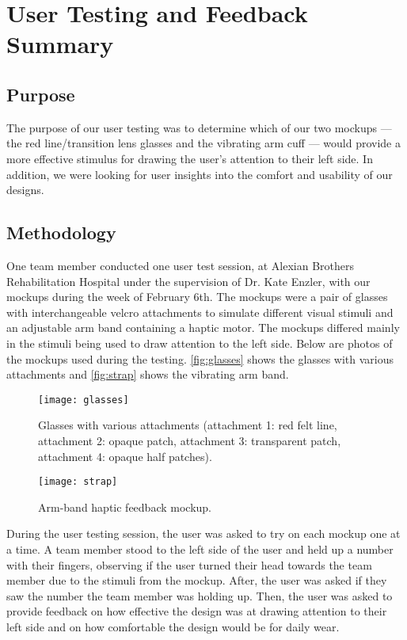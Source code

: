 \chapter{User Testing and Feedback Summary}
\label{chap:feedback}

\section{Purpose}

The purpose of our user testing was to determine which of our two mockups ---
the red line/transition lens glasses and the vibrating arm cuff --- would
provide a more effective stimulus for drawing the user’s attention to their
left side. In addition, we were looking for user insights into the comfort and
usability of our designs.

\section{Methodology}

One team member conducted one user test session, at Alexian Brothers
Rehabilitation Hospital under the supervision of Dr. Kate Enzler, with our
mockups during the week of February 6th. The mockups were a pair of glasses
with interchangeable velcro attachments to simulate different visual stimuli
and an adjustable arm band containing a haptic motor. The mockups differed
mainly in the stimuli being used to draw attention to the left side. Below are
photos of the mockups used during the testing. \autoref{fig:glasses} shows the
glasses with various attachments and \autoref{fig:strap} shows the vibrating
arm band.

\begin{figure}[h]
  \centering
  \texttt{[image: glasses]}
  \caption{Glasses with various attachments (attachment 1: red felt line,
    attachment 2: opaque patch, attachment 3: transparent patch, attachment 4:
    opaque half patches).}
  \label{fig:glasses}
\end{figure}

\begin{figure}[h]
  \centering
  \texttt{[image: strap]}
  \caption{Arm-band haptic feedback mockup.}
  \label{fig:strap}
\end{figure}

During the user testing session, the user was asked to try on each mockup one
at a time.  A team member stood to the left side of the user and held up a
number with their fingers, observing if the user turned their head towards the
team member due to the stimuli from the mockup. After, the user was asked if
they saw the number the team member was holding up. Then, the user was asked to
provide feedback on how effective the design was at drawing attention to their
left side and on how comfortable the design would be for daily wear.

